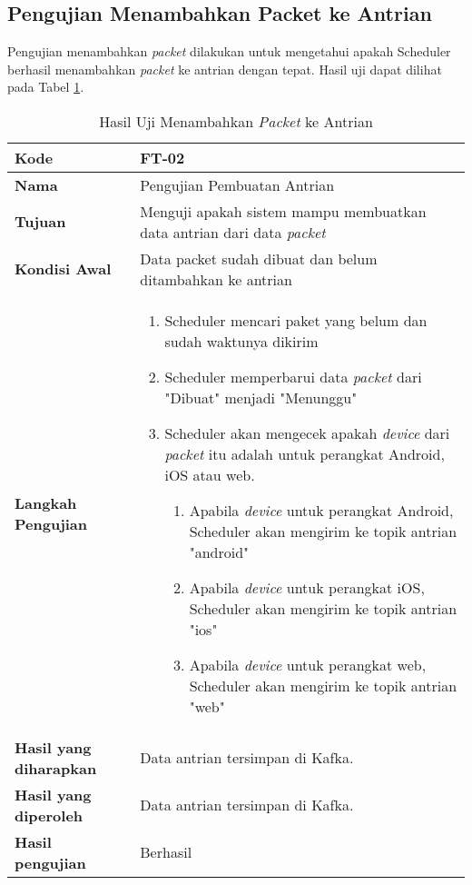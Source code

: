 \subsection{Pengujian Menambahkan Packet ke Antrian}
\par Pengujian menambahkan \textit{packet} dilakukan untuk mengetahui apakah Scheduler berhasil menambahkan \textit{packet} ke antrian dengan tepat. Hasil uji dapat dilihat pada Tabel \ref{t:uji_pembuatan_antrian}.
\begin{longtable}{|p{3cm}|p{6.5cm}|}
	\caption{Hasil Uji Menambahkan \textit{Packet} ke Antrian} \label{t:uji_pembuatan_antrian} \\ \hline
	\textbf{Kode} & FT-02 \\ \hline
	\textbf{Nama} & Pengujian Pembuatan Antrian \\ \hline
	\textbf{Tujuan} & Menguji apakah sistem mampu membuatkan data antrian dari data \textit{packet} \\ \hline
	\textbf{Kondisi Awal} & Data packet sudah dibuat dan belum ditambahkan ke antrian \\ \hline
	\textbf{Langkah Pengujian} &  
	\begin{enumerate}
		\item Scheduler mencari paket yang belum dan sudah waktunya dikirim
		\item Scheduler memperbarui data \textit{packet} dari "Dibuat" menjadi "Menunggu"
		\item Scheduler akan mengecek apakah \textit{device} dari \textit{packet} itu adalah untuk perangkat Android, iOS atau web.
		\begin{enumerate}
			\item Apabila \textit{device} untuk perangkat Android, Scheduler akan mengirim ke topik antrian "android"
			\item Apabila \textit{device} untuk perangkat iOS, Scheduler akan mengirim ke topik antrian "ios"
			\item Apabila \textit{device} untuk perangkat web, Scheduler akan mengirim ke topik antrian "web"
		\end{enumerate}
	\end{enumerate} \\ \hline
	\textbf{Hasil yang diharapkan} & Data antrian tersimpan di Kafka. \\ \hline
	\textbf{Hasil yang diperoleh} & Data antrian tersimpan di Kafka. \\ \hline
	\textbf{Hasil pengujian} & Berhasil \\ \hline
\end{longtable}

